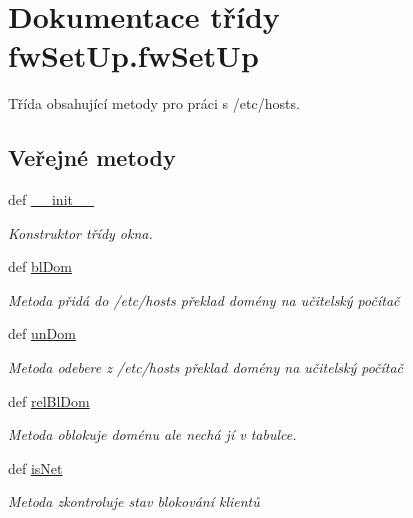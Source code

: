 \hypertarget{classfwSetUp_1_1fwSetUp}{\section{Dokumentace třídy fw\-Set\-Up.\-fw\-Set\-Up}
\label{dd/dd2/classfwSetUp_1_1fwSetUp}
}


Třída obsahující metody pro práci s /etc/hosts.  


\subsection*{Veřejné metody}
\begin{DoxyCompactItemize}
\item 
def \hyperlink{classfwSetUp_1_1fwSetUp_ad05f56aa9dd4503852ec2bcfb2a3afe2}{\-\_\-\-\_\-init\-\_\-\-\_\-}
\begin{DoxyCompactList}\small\item\em Konstruktor třídy okna. \end{DoxyCompactList}\item 
def \hyperlink{classfwSetUp_1_1fwSetUp_aea3760656409015f15b9b3450edd70e1}{bl\-Dom}
\begin{DoxyCompactList}\small\item\em Metoda přidá do /etc/hosts překlad domény na učitelský počítač \end{DoxyCompactList}\item 
def \hyperlink{classfwSetUp_1_1fwSetUp_a3a03c76b94db3bc750260ab64d76d755}{un\-Dom}
\begin{DoxyCompactList}\small\item\em Metoda odebere z /etc/hosts překlad domény na učitelský počítač \end{DoxyCompactList}\item 
def \hyperlink{classfwSetUp_1_1fwSetUp_ab96ab2edba8c87302754c40491ca0d17}{rel\-Bl\-Dom}
\begin{DoxyCompactList}\small\item\em Metoda oblokuje doménu ale nechá jí v tabulce. \end{DoxyCompactList}\item 
def \hyperlink{classfwSetUp_1_1fwSetUp_a75a8c09d8493ac43747cb4c518bef7dd}{is\-Net}
\begin{DoxyCompactList}\small\item\em Metoda zkontroluje stav blokování klientů \end{DoxyCompactList}\item 

\end{DoxyCompactItemize}
